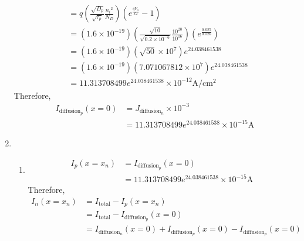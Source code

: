 \documentclass[fleqn, a4paper, 10pt, oneside]{amsart}
\theoremstyle{definition}
\theoremstyle{theorem}
\begin{document}
\begin{solution}
\begin{enumerate}[leftmargin=*]
\begin{align*}
                                                              & = q \left( \frac{\sqrt{D_p}}{\sqrt{\tau_p}} \frac{{n_i}^2}{N_D} \right) \left( e^{\frac{q V_a}{k T}} - 1 \right)                                               \\
                                                              & = \left( 1.6 \times 10^{-19} \right) \left( \frac{\sqrt{10}}{\sqrt{0.2 \times 10^{-6}}} \frac{10^{20}}{10^{16}} \right) \left( e^{\frac{0.625}{0.026}} \right) \\
                                                              & = \left( 1.6 \times 10^{-19} \right) \left( \sqrt{50} \times 10^7 \right) e^{24.038461538}                                                                     \\
                                                              & = \left( 1.6 \times 10^{-19} \right) \left( 7.071067812 \times 10^7 \right) e^{24.038461538}                                                                   \\
                                                              & = 11.313708499 e^{24.038461538} \times 10^{-12} \si{\ampere\per\centi\metre\squared}
			\end{align*}
			Therefore,
			\begin{align*}
				I_{\text{diffusion}_p}(x = 0) & = J_{\text{diffusion}_n} \times 10^{-3} \\
                                                              & = 11.313708499 e^{24.038461538} \times 10^{-15} \si{\ampere}
			\end{align*}
		\item
			\begin{enumerate}[leftmargin=*]
				\item
					\begin{align*}
						I_p(x = x_n) & = I_{\text{diffusion}_p}(x = 0) \\
                                                             & = 11.313708499 e^{24.038461538} \times 10^{-15} \si{\ampere}
					\end{align*}
					Therefore,
					\begin{align*}
						I_n(x = x_n) & = I_{\text{total}} - I_p(x = x_n)                                                               \\
                                                             & = I_{\text{total}} - I_{\text{diffusion}_p}(x = 0)                                              \\
                                                             & = I_{\text{diffusion}_n}(x = 0) + I_{\text{diffusion}_p}(x = 0) - I_{\text{diffusion}_p}(x = 0) \\

\end{align*}
\end{enumerate}
\end{enumerate}
\end{solution}
\end{document}
